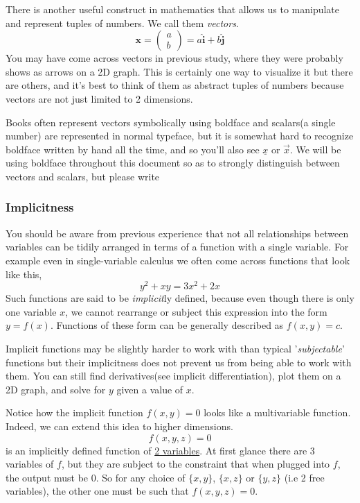 \documentclass[14pt]{article}
\begin{document}
	There is another useful construct in mathematics that allows us to manipulate and represent tuples of numbers. We call them \textit{vectors}. 
	\begin{equation*}
		\mathbf{x} = \begin{pmatrix}
			a \\
			b 
		\end{pmatrix} = a \hat{\mathbf{i}} + b \hat{\mathbf{j}}
	\end{equation*}
	You may have come across vectors in previous study, where they were probably shows as arrows on a 2D graph. This is certainly one way to visualize it but there are others, and it's best to think of them as abstract tuples of numbers because vectors are not just limited to 2 dimensions.
	
	Books often represent vectors symbolically using boldface and scalars(a single number) are represented in normal typeface, but it is somewhat hard to recognize boldface written by hand all the time, and so you'll also see $\underline{x}$ or $\vec{x}$. We will be using boldface throughout this document so as to strongly distinguish between vectors and scalars, but please write
	
	\subsubsection{Implicitness}
	You should be aware from previous experience that not all relationships between variables can be tidily arranged in terms of a function with a single variable. For example even in single-variable calculus we often come across functions that look like this,
	\begin{equation*}
		y^2 + xy = 3x^2 + 2x
	\end{equation*}
	Such functions are said to be \textit{implicit}ly defined, because even though there is only one variable $x$, we cannot rearrange or subject this expression into the form $y = f(x)$. Functions of these form can be generally described as $f(x,y)=c$. 
	
	Implicit functions may be slightly harder to work with than typical '\textit{subjectable}' functions but their implicitness does not prevent us from being able to work with them. You can still find derivatives{\footnotesize (see implicit differentiation)}, plot them on a 2D graph, and solve for $y$ given a value of $x$.
	
	Notice how the implicit function $f(x, y) = 0$ looks like a multivariable function. Indeed, we can extend this idea to higher dimensions. 
	\begin{equation*}
		f(x, y, z) = 0
	\end{equation*}
	is an implicitly defined function of \underline{2 variables}. At first glance there are 3 variables of $f$, but they are subject to the constraint that when plugged into $f$, the output must be 0. So for any choice of $\{x, y \}$, $\{x, z\}$ or $\{y, z\}$ {\footnotesize (i.e 2 free variables)}, the other one must be such that $f(x, y, z) = 0$.
	
\end{document}
